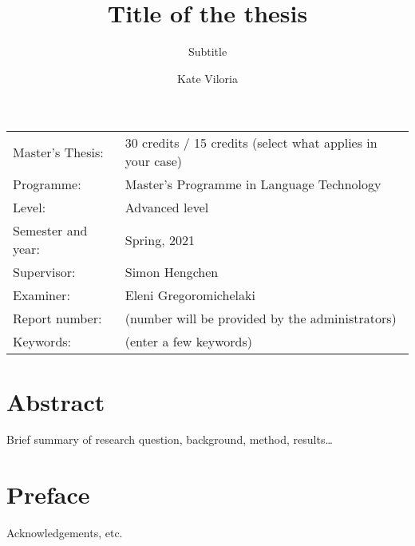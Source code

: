 \documentclass[11pt, a4paper]{article}
\title{Title of the thesis}
\subtitle{Subtitle}
\author{Kate Viloria}
\begin{document}
\begin{titlepage}

\maketitle

\vfill

\begingroup
\renewcommand*{\arraystretch}{1.2}
\begin{tabular}{l@{\hskip 20mm}l}
\hline
Master's Thesis: & 30 credits / 15 credits (select what applies in your case)\\
Programme: & Master’s Programme in Language Technology\\
Level: & Advanced level \\
Semester and year: & Spring, 2021\\
Supervisor: & Simon Hengchen\\
Examiner: & Eleni Gregoromichelaki\\
Report number: & (number will be provided by the administrators) \\
Keywords: & (enter a few keywords) 
\end{tabular}
\endgroup

\thispagestyle{empty}
\end{titlepage}

\newpage
\singlespacing
\section*{Abstract}

Brief summary of research question, background, method, results\ldots

\thispagestyle{empty}

\newpage
\section*{Preface}

Acknowledgements, etc.

\thispagestyle{empty}
\end{document}
